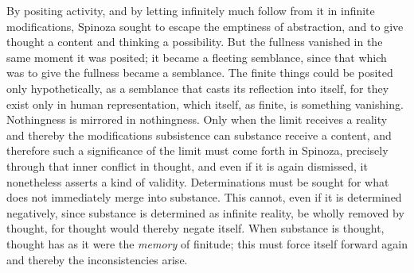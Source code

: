 \documentclass[12pt,a4paper,openany]{book}
\newcommand{\opage}[1]{\marginnote{\footnotesize\textit{[#1]}}}
\begin{document}
By positing activity, and by letting infinitely much follow from it in
infinite modifications, Spinoza sought to escape the emptiness of
abstraction, and to give thought a content and thinking a possibility. But
the fullness vanished in the same moment it was posited; it became a
fleeting semblance, since that which was to give the fullness became a semblance. The
finite things could be posited only hypothetically, as a semblance that casts
its reflection into itself, for they exist only in human
representation, which itself, as finite, is something vanishing. Nothingness
is mirrored in nothingness. Only when the limit receives a reality and
thereby the modifications subsistence can substance receive a content, and
therefore such a significance of the limit must come forth in Spinoza,
precisely through that inner conflict in thought, and even if it is again
dismissed, it nonetheless asserts a kind of validity. Determinations must be sought
for what does not immediately merge into substance. This
cannot, even if it is determined negatively, since substance is determined
as infinite reality, be wholly removed by thought, for thought
would thereby negate itself. When substance is thought, thought has
as it were
\opage{63}\setcounter{footnote}{0}the \emph{memory} of finitude; this must force itself forward again and
thereby the inconsistencies arise.
\end{document}
